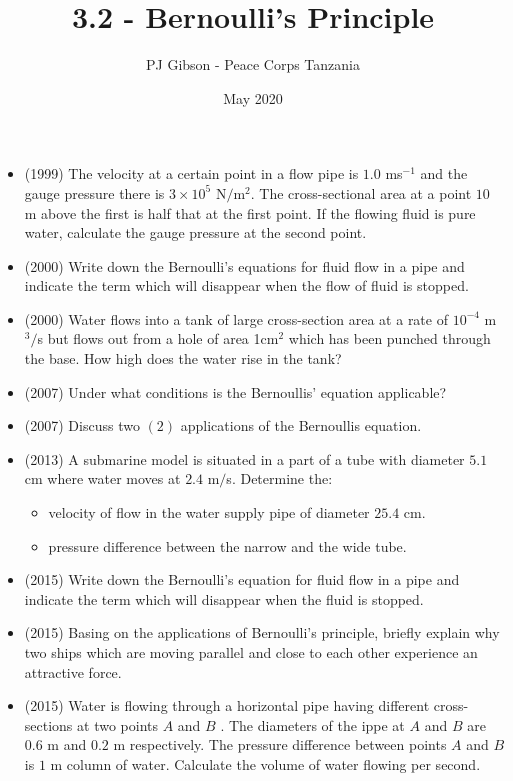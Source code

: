 \documentclass{article}
\title{\textbf{3.2 - Bernoulli's Principle}}
\author{PJ Gibson - Peace Corps Tanzania}
\date{May 2020}
\begin{document}
\maketitle

\begin{itemize}
\item (1999)  The velocity at a certain point in a flow pipe is $ 1.0$ ms$ ^{-1}$ and the gauge pressure there is $ 3 \times 10^5 $ N$/$m$ ^{2}$ ​ . The cross-sectional area at a point $ 10$ m above the first is half that at the first point. If the flowing fluid is pure water, calculate the gauge pressure at the second point.
\item (2000)  Write down the Bernoulli's equations for fluid flow in a pipe and indicate the term which will disappear when the flow of fluid is stopped.
\item (2000)  Water flows into a tank of large cross-section area at a rate of $ 10^{-4}$ m$ ^{3}/$s but flows out from a  hole of area 1cm$ ^{2}$ which has been punched through the base. How high does the water rise in the tank?
\item (2007)  Under what conditions is the Bernoullis’ equation applicable?
\item (2007)  Discuss two $ (2)$ applications of the Bernoullis equation. 
\item (2013)  A submarine model is situated in a part of a tube with diameter $ 5.1$ cm where water moves at $ 2.4$ m$/$s.  Determine the:
 \begin{itemize}
\item velocity of flow in the water supply pipe of diameter $ 25.4$ cm. 
\item pressure difference between the narrow and the wide tube. 
\end{itemize}
\item (2015)  Write down the Bernoulli’s equation for fluid flow in a pipe and indicate the term which will disappear when the fluid is stopped.
\item (2015)  Basing on the applications of Bernoulli’s principle, briefly explain why two ships which are moving parallel and close to each other experience an attractive force.
\item (2015)  Water is flowing through a horizontal pipe having different cross-sections at two points $ A$ and $ B$ .  The diameters of the ippe at $ A$ and $ B$ are $ 0.6$ m and $ 0.2$ m respectively.   The pressure difference between points $ A$ and $ B$ is $ 1$ m column of water.  Calculate the volume of water flowing per second.

\end{itemize}
\end{document}
